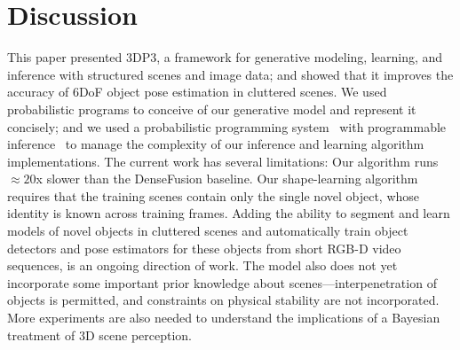 
\section{Discussion}
\vspace{-2mm}This paper presented 3DP3, a framework for generative modeling, learning, and inference with structured scenes and image data;
and showed that it improves the accuracy of 6DoF object pose estimation in cluttered scenes.
We used probabilistic programs to conceive of our generative model and represent it concisely; and
we used a probabilistic programming system~\citep{cusumano2019gen} with programmable inference~\citep{mansinghka2018probabilistic} to manage the complexity of our inference and learning algorithm implementations.
The current work has several limitations:
Our algorithm runs $\approx20$x slower than the DenseFusion baseline.
Our shape-learning algorithm requires that the training scenes contain only the single novel object,
whose identity is known across training frames.
Adding the ability to segment and learn models of novel objects in cluttered scenes
and automatically train object detectors and pose estimators for these objects from short RGB-D video sequences,
is an ongoing direction of work.
The model also does not yet incorporate some important prior knowledge about scenes---interpenetration of objects is permitted,
and constraints on physical stability are not incorporated.
More experiments are also needed to understand the implications of a Bayesian treatment of 3D scene perception.
